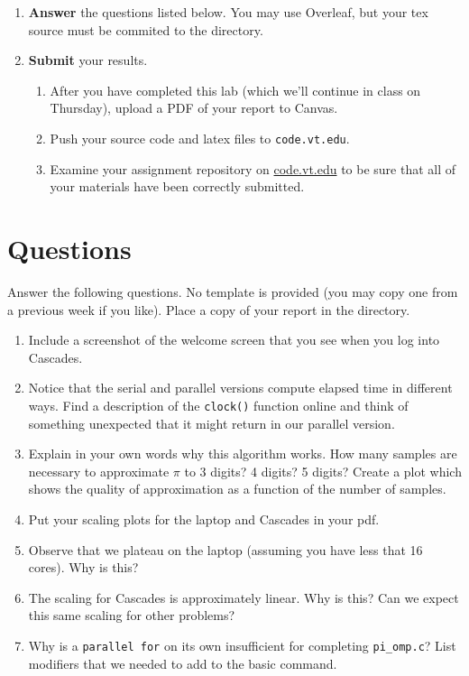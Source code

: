 \documentclass[letter]{article}
\newcommand{\mypath}[1]{\texttt{\path{#1}}}
\begin{document}
\begin{enumerate}
    \item \textbf{Answer} the questions listed below.  You may use Overleaf, but your tex source must be commited to the \mypath{reports/} directory.

    \item \textbf{Submit} your results.
        \begin{enumerate}
            \item After you have completed this lab (which we'll continue in class on Thursday), upload a PDF of your report to Canvas.
            \item Push your source code and latex files to \texttt{code.vt.edu}.
            \item Examine your assignment repository on \url{code.vt.edu} to be sure that all of your materials have been correctly submitted.
        \end{enumerate}
   
\end{enumerate}

\pagebreak
\section*{Questions}

    Answer the following questions.  No template is provided (you may copy one from a previous week if you like).  Place a copy of your report in the \mypath{reports/} directory.

    \begin{enumerate}
        \item Include a screenshot of the welcome screen that you see when you log into Cascades. 
        \item Notice that the serial and parallel versions compute elapsed time in different ways.  Find a description of the \texttt{clock()} function online and think of something unexpected that it might return in our parallel version.
        \item Explain in your own words why this algorithm works.  How many samples are necessary to approximate $\pi$ to 3 digits? 4 digits? 5 digits?  Create a plot which shows the quality of approximation as a function of the number of samples.
        \item Put your scaling plots for the laptop and Cascades in your pdf. 
        \item Observe that we plateau on the laptop (assuming you have less that 16 cores). Why is this?
        
        \item The scaling for Cascades is approximately linear. Why is this? Can we expect this same scaling for other problems?
        
    \item Why is a \texttt{parallel for} on its own insufficient for completing \texttt{pi\_omp.c}?  List modifiers that we needed to add to the basic command.
        
    \end{enumerate}
\end{document}
